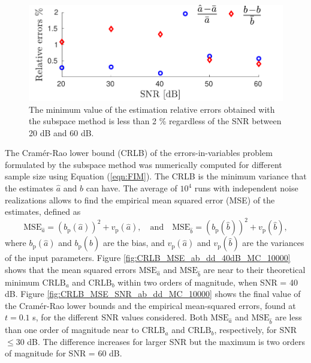 \begin{figure}[!htbp]
\centering
\includegraphics[width=\columnwidth]{./ChapterRampInput/fig/Fig_4.pdf} 
\caption{ \label{fig:rele_SNR_dd_10000} The minimum value of the estimation relative errors obtained with the subspace method is less than 2  \% regardless of the SNR between 20 dB and 60 dB. }
\end{figure}

The Cram\'er-Rao lower bound (CRLB) of the errors-in-variables problem formulated by the subspace method was numerically computed for different sample size using Equation (\ref{eqn:FIM}).
The CRLB is the minimum variance that the estimates $\widehat{a}$ and $\widehat{b}$ can have.
The average of $10^4$ runs with independent noise realizations allows to find the empirical mean squared error (MSE) of the estimates, defined as
\begin{equation} \mathrm{MSE}_{\widehat{a}} = \left(b_{\mathrm{p}}\left( \widehat{a} \right) \right)^2 + v_{\mathrm{p}} \left( \widehat{a} \right), \quad \text{and} \quad  \mathrm{MSE}_{\widehat{b}} = ( b_{\mathrm{p}} ( \widehat{b} ) )^2 + v_{\mathrm{p}} ( \widehat{b} ), \end{equation}
where $b_{\mathrm{p}} \left( \widehat{a} \right)$ and $b_{\mathrm{p}} ( \widehat{b} )$ are the bias, and $v_{\mathrm{p}} \left( \widehat{a} \right)$ and $v_{\mathrm{p}} ( \widehat{b} )$ are the variances of the input parameters.
Figure \ref{fig:CRLB_MSE_ab_dd_40dB_MC_10000} shows that the mean squared errors $\mathrm{MSE}_{\hat{a}}$ and $\mathrm{MSE}_{\hat{b}}$ are near to their theoretical minimum $\mathrm{CRLB}_{a}$ and $\mathrm{CRLB}_{b}$ within two orders of magnitude, when SNR = 40 dB.
Figure \ref{fig:CRLB_MSE_SNR_ab_dd_MC_10000} shows the final value of the Cram\'er-Rao lower bounds and the empirical mean-squared errors, found at $t=0.1$ s, for the different SNR values considered.
Both $\mathrm{MSE}_{\hat{a}}$ and $\mathrm{MSE}_{\hat{b}}$ are less than one order of magnitude near to $\mathrm{CRLB}_a$ and $\mathrm{CRLB}_{b}$, respectively, for SNR $\leq 30$ dB.
The difference increases for larger SNR but the maximum is two orders of magnitude for SNR = 60 dB.

